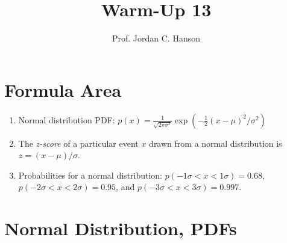\documentclass{article}
\begin{document}
\title{Warm-Up 13}
\author{Prof. Jordan C. Hanson}

\maketitle

\section{Formula Area}

\begin{enumerate}
\item Normal distribution PDF: $p(x) = \frac{1}{\sqrt{2\pi \sigma^2}} \exp\left( -\frac{1}{2}(x-\mu)^2/\sigma^2 \right)$
\item The \textit{z-score} of a particular event $x$ drawn from a normal distribution is $z = (x-\mu)/\sigma$.
\item Probabilities for a normal distribution: $p(-1\sigma < x < 1\sigma) = 0.68$, $p(-2\sigma < x < 2\sigma) = 0.95$, and $p(-3\sigma < x < 3\sigma) = 0.997$.
\end{enumerate}

\section{Normal Distribution, PDFs}
\end{document}
